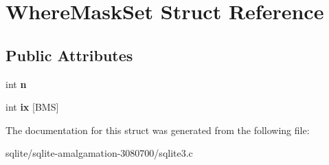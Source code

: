 \hypertarget{struct_where_mask_set}{\section{Where\+Mask\+Set Struct Reference}
\label{struct_where_mask_set}
}
\subsection*{Public Attributes}
\begin{DoxyCompactItemize}
\item 
\hypertarget{struct_where_mask_set_a09923e1dee2157c78c5ae0df65e8ee7c}{int {\bfseries n}}\label{struct_where_mask_set_a09923e1dee2157c78c5ae0df65e8ee7c}

\item 
\hypertarget{struct_where_mask_set_a9de4e7b27d4f793f37c1ead7b44ecb48}{int {\bfseries ix} \mbox{[}B\+M\+S\mbox{]}}\label{struct_where_mask_set_a9de4e7b27d4f793f37c1ead7b44ecb48}

\end{DoxyCompactItemize}


The documentation for this struct was generated from the following file\+:\begin{DoxyCompactItemize}
\item 
sqlite/sqlite-\/amalgamation-\/3080700/sqlite3.\+c\end{DoxyCompactItemize}
